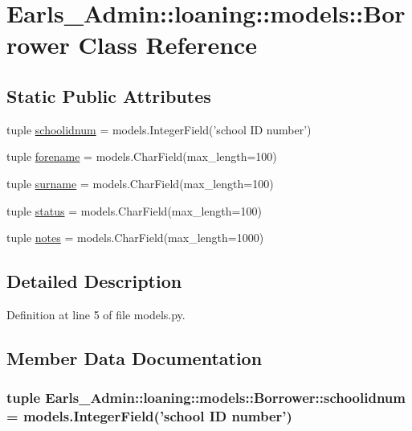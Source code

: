 \hypertarget{classEarls__Admin_1_1loaning_1_1models_1_1Borrower}{
\section{Earls\_\-Admin::loaning::models::Borrower Class Reference}
\label{classEarls__Admin_1_1loaning_1_1models_1_1Borrower}
}
\subsection*{Static Public Attributes}
\begin{CompactItemize}
\item 
tuple \hyperlink{classEarls__Admin_1_1loaning_1_1models_1_1Borrower_893b19fb5110d74d3f40a9da6186fe81}{schoolidnum} = models.IntegerField('school ID number')
\item 
tuple \hyperlink{classEarls__Admin_1_1loaning_1_1models_1_1Borrower_d258c5bbe73c92acbd2a0a8806457fc8}{forename} = models.CharField(max\_\-length=100)
\item 
tuple \hyperlink{classEarls__Admin_1_1loaning_1_1models_1_1Borrower_85e368de3519118913eba46b822518f2}{surname} = models.CharField(max\_\-length=100)
\item 
tuple \hyperlink{classEarls__Admin_1_1loaning_1_1models_1_1Borrower_939baa46ff1cda6fcffd2ae9ba9c6f70}{status} = models.CharField(max\_\-length=100)
\item 
tuple \hyperlink{classEarls__Admin_1_1loaning_1_1models_1_1Borrower_30313365942be60eaa1f976e0c627b77}{notes} = models.CharField(max\_\-length=1000)
\end{CompactItemize}


\subsection{Detailed Description}


Definition at line 5 of file models.py.

\subsection{Member Data Documentation}
\hypertarget{classEarls__Admin_1_1loaning_1_1models_1_1Borrower_893b19fb5110d74d3f40a9da6186fe81}{
\subsubsection[schoolidnum]{\setlength{\rightskip}{0pt plus 5cm}tuple {\bf Earls\_\-Admin::loaning::models::Borrower::schoolidnum} = models.IntegerField('school ID number')}}
\label{classEarls__Admin_1_1loaning_1_1models_1_1Borrower_893b19fb5110d74d3f40a9da6186fe81}




